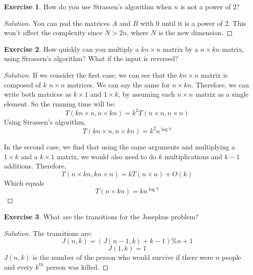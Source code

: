 \documentclass[12pt,letterpaper]{article}
\theoremstyle{definition}
\newtheorem*{exercise}{Exercise}
\newenvironment{solution}
  {\renewcommand\qedsymbol{$\blacksquare$}\begin{proof}[Solution]}
  {\end{proof}}
\begin{document}
\begin{exercise}
  How do you use Strassen's algorithm when $n$ is not a power of 2?
\end{exercise}
\begin{solution}
  You can pad the matrices $A$ and $B$ with 0 until it is a power of 2. This won't affect the complexity since $N > 2n$, where $N$ is the new dimension.
\end{solution}

\begin{exercise}
  How quickly can you multiply a $kn \times n$ matrix by a $n \times kn$ matrix, using Strassen's algorithm? What if the input is reversed?
\end{exercise}
\begin{solution}
  If we consider the first case, we can see that the $kn \times n$ matrix is composed of $k$ $n \times n$ matrices. We can say the same for $n \times kn$. Therefore, we can write both matrices as $k \times 1$ and $1 \times k$, by assuming each $n \times n$ matrix as a single element. So the running time will be:
  \[T(kn \times n, n \times kn) = k^2 T(n \times n, n \times n)\]
Using Strassen's algorithm,
\[T(kn \times n, n \times kn) = k^2 n^{\log 7}\]

In the second case, we find that using the same arguments and multiplying a $1 \times k$ and a $k \times 1$ matrix, we would also need to do $k$ multiplications and $k-1$ additions. Therefore,
\[T(n \times kn, kn \times n) = kT(n \times n) + O(k)\]
Which equals
\[T(n \times kn) = k n^{\log 7}\]
\end{solution}

\begin{exercise}
  What are the transitions for the Josephus problem?
\end{exercise}
\begin{solution}
  The transitions are:
  \[J(n,k) = (J(n-1,k) + k - 1)\%n + 1\]
  \[J(1,k) = 1\]
  $J(n,k)$ is the number of the person who would survive if there were $n$ people and every $k^{th}$ person was killed.
\end{solution}
\end{document}
